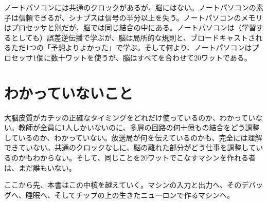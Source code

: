 ノートパソコンには共通のクロックがあるが、脳にはない。ノートパソコンの素子は信頼できるが、シナプスは信号の半分以上を失う。ノートパソコンのメモリはプロセッサと別だが、脳では同じ結合の中にある。ノートパソコンは（学習するとしても）誤差逆伝播で学ぶが、脳は局所的な規則と、ブロードキャストされるただ1つの「予想よりよかった」で学ぶ。そして何より、ノートパソコンはプロセッサ1個に数十ワットを使うが、脳はすべてを合わせて20ワットである。

\section*{わかっていないこと}

大脳皮質がカチッの正確なタイミングをどれだけ使っているのか、わかっていない。教師が全員に1人しかいないのに、多層の回路の何十億もの結合をどう調整しているのか、わかっていない。放送局が何を伝えているのかも、完全には理解できていない。共通のクロックなしに、脳の離れた部分がどう仕事を調整しているのかもわからない。そして、同じことを20ワットでこなすマシンを作れる者は、まだ誰もいない。

ここから先、本書はこの中核を越えていく。マシンの入力と出力へ、そのデバッグへ、睡眠へ、そしてチップの上の生きたニューロンで作るマシンへ。

